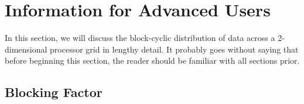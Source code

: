 \section[]{Information for Advanced Users}
\label{sec:advanced}

In this section, we will discuss the block-cyclic distribution of data across a 2-dimensional processor grid in lengthy detail.  It probably goes without saying that before beginning this section, the reader should be familiar with all sections prior.
 
\subsection[]{Blocking Factor}

